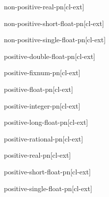 \documentclass[10pt,english]{book}
\begin{document}
\begin{function}{non-positive-real-p}{n}[cl-ext]
  
\end{function}

\begin{function}{non-positive-short-float-p}{n}[cl-ext]
  
\end{function}

\begin{function}{non-positive-single-float-p}{n}[cl-ext]
  
\end{function}

\begin{function}{positive-double-float-p}{n}[cl-ext]
  
\end{function}

\begin{function}{positive-fixnum-p}{n}[cl-ext]
  
\end{function}

\begin{function}{positive-float-p}{n}[cl-ext]
  
\end{function}

\begin{function}{positive-integer-p}{n}[cl-ext]
  
\end{function}

\begin{function}{positive-long-float-p}{n}[cl-ext]
  
\end{function}

\begin{function}{positive-rational-p}{n}[cl-ext]
  
\end{function}

\begin{function}{positive-real-p}{n}[cl-ext]
  
\end{function}

\begin{function}{positive-short-float-p}{n}[cl-ext]
  
\end{function}

\begin{function}{positive-single-float-p}{n}[cl-ext]
  
\end{function}
\end{document}
